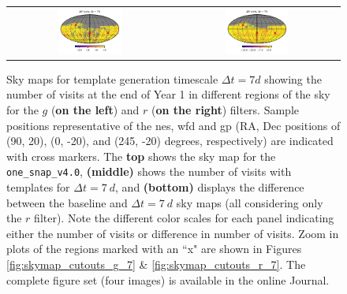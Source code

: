 \documentclass[preprintm,linenumbers]{aastex631}
\newcommand{\baseline}{\texttt{one\_snap\_v4.0}\xspace}
\begin{document}
\begin{figure}
\begin{tabular}{c c}
         \includegraphics[width=0.4\textwidth]{results/skymaps_cutout/skymaps_cutout_delta_first_year_one_snap_v4_0_10yrs_db_noDD_noTwi_tscale-7_nside-256_doAllTemplateMetrics_reduceCount_g_noDD_noTwi.pdf} &
         \includegraphics[width=0.4\textwidth]{results/skymaps_cutout/skymaps_cutout_delta_first_year_one_snap_v4_0_10yrs_db_noDD_noTwi_tscale-7_nside-256_doAllTemplateMetrics_reduceCount_r_noDD_noTwi.pdf} \\

   \end{tabular}

        \caption{Sky maps for template generation timescale $\Delta t = 7 \si{d}$ showing the number of visits at the end of Year 1 in different regions of the sky for the $g$ (\textbf{on the left}) and  $r$ (\textbf{on the right}) filters. 
        Sample positions representative of the \gls*{nes}, \gls*{wfd} and \gls*{gp} (RA, Dec positions of (90, 20), (0, -20), and (245, -20) degrees, respectively) are indicated with cross markers. 
        The \textbf{top} shows the sky map for the \baseline, \textbf{(middle)} shows the number of visits with templates for $\Delta t = 7\ \si{d}$, and \textbf{(bottom)} displays the difference between the baseline and $\Delta t = 7\ \si{d}$ sky maps (all considering only the $r$ filter). Note the different color scales for each panel indicating either the number of visits or difference in number of visits. 
        Zoom in plots of the regions marked with an ``x" are shown in Figures \ref{fig:skymap_cutouts_g_7} \& \ref{fig:skymap_cutouts_r_7}. 
        The complete figure set (four images) is available in the online Journal. 
        }
        \label{fig:all_together_r_7d}
	\end{figure}
\end{document}
